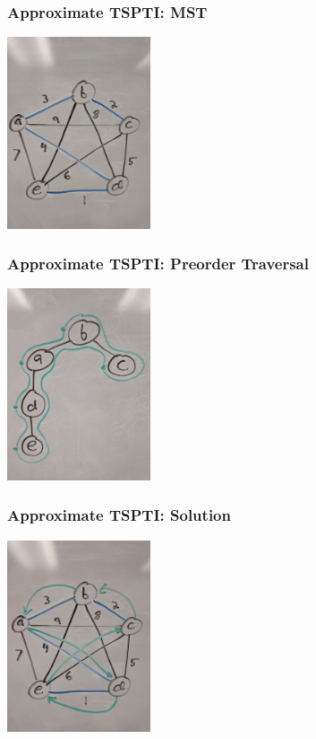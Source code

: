 \documentclass{beamer}
\begin{document}
\begin{frame} \frametitle{Approximate TSPTI: MST}
  \begin{center}
    \includegraphics[height=160pt]{13-tspti-mst.jpg}
  \end{center}
\end{frame}

\begin{frame} \frametitle{Approximate TSPTI: Preorder Traversal}
  \begin{center}
    \includegraphics[height=160pt]{13-tspti-preorder.jpg}
  \end{center}
\end{frame}

\begin{frame} \frametitle{Approximate TSPTI: Solution}
  \begin{center}
    \includegraphics[height=160pt]{13-tspti-output.jpg}
  \end{center}
\end{frame}
\end{document}
